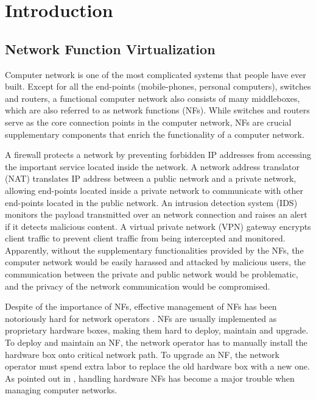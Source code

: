 \chapter {Introduction}
\label{ch:introduction}

\section {Network Function Virtualization}

Computer network \cite{Tanenbaum:2010:CN:1942194} is one of the most complicated systems that people have ever built. Except for all the end-points (mobile-phones, personal computers), switches and routers, a functional computer network also consists of many middleboxes, which are also referred to as network functions (NFs). While switches and routers serve as the core connection points in the computer network, NFs are crucial supplementary components that enrich the functionality of a computer network.

A firewall \cite{purdy2004linux} protects a network by preventing forbidden IP addresses from accessing the important service located inside the network. A network address translator (NAT) \cite{tsirtsis2000network} translates IP address between a public network and a private network, allowing end-points located inside a private network to communicate with other end-points located in the public network. An intrusion detection system (IDS) \cite{bro, paxson1999bro, snort} monitors the payload transmitted over an network connection and raises an alert if it detects malicious content. A virtual private network (VPN) gateway \cite{nobori2014vpn} encrypts client traffic to prevent client traffic from being intercepted and monitored. Apparently, without the supplementary functionalities provided by the NFs, the computer network would be easily harassed and attacked by malicious users, the communication between the private and public network would be problematic, and the privacy of the network communication would be compromised.

Despite of the importance of NFs, effective management of NFs has been notoriously hard for network operators \cite{sherry2012making}. NFs are usually implemented as proprietary hardware boxes, making them hard to deploy, maintain and upgrade. To deploy and maintain an NF, the network operator has to manually install the hardware box onto critical network path. To upgrade an NF, the network operator must spend extra labor to replace the old hardware box with a new one. As pointed out in \cite{sherry2012making}, handling hardware NFs has become a major trouble when managing computer networks.

